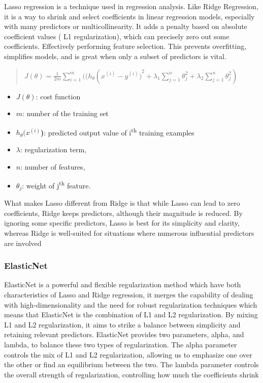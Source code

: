 Lasso regression is a technique used in regression analysis. Like Ridge Regression, it is a way to shrink and select coefficients in linear regression models, especially with many predictors or multicollinearity. It adds a penalty based on absolute coefficient values ( L1 regularization), which can precisely zero out some coefficients. Effectively performing feature selection. This prevents overfitting, simplifies models, and is great when only a subset of predictors is vital.
\begin{quote}
    
    \(J(\theta) = \frac{1}{2m}\sum_{i=1}^{m}((h_{\theta}(x^{(i)} - {y^{(i)})}^{2} + \lambda_{1}\sum_{j=1}^{n}\theta_{j}^{2} + \lambda_{2}\sum_{j=1}^{n}\theta_{j}^{2})\)
\end{quote}

\begin{itemize}
    \item \(J(\theta)\): cost function
    \item \(m\): number of the training set
    \item \(h_{\theta}(x^{(i)}\)\textbf{)}: predicted output value of
    i\textsuperscript{th} training examples
    \item \(\lambda\): regularization term,
    \item \(n\): number of features,
    \item \(\theta_{j}\): weight of j\textsuperscript{th} feature.

\end{itemize}

What makes Lasso different from Ridge is that while Lasso can lead to zero coefficients, Ridge keeps predictors, although their magnitude is reduced. By ignoring some specific predictors, Lasso is best for its simplicity and clarity, whereas Ridge is well-suited for situations where numerous influential predictors are involved

\subsubsection{ElasticNet}

ElasticNet is a powerful and flexible regularization method which have both characteristics of Lasso and Ridge regression, it merges the capability of dealing with high-dimensionality and the need for robust regularization techniques which means that ElasticNet is the combination of L1 and L2 regularization. By mixing L1 and L2 regularization, it aims to strike a balance between simplicity and retaining relevant predictors. ElasticNet provides two parameters, alpha, and lambda, to balance these two types of regularization. The alpha parameter controls the mix of L1 and L2 regularization, allowing us to emphasize one over the other or find an equilibrium between the two. The lambda parameter controls the overall strength of regularization, controlling how much the coefficients shrink

